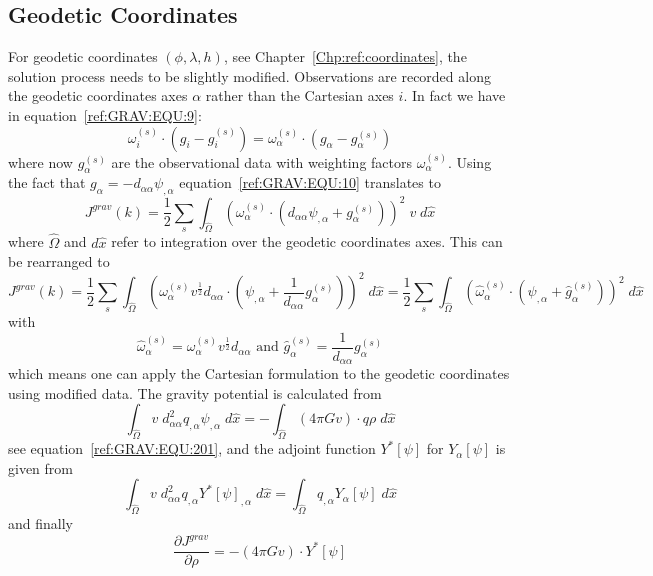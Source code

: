 \subsection{Geodetic Coordinates }
For geodetic coordinates $(\phi, \lambda, h)$, see Chapter~\ref{Chp:ref:coordinates}, the solution process needs to be slightly modified.
Observations are recorded along the geodetic coordinates axes $\alpha$ rather than the Cartesian axes $i$. In fact we
have in equation~\ref{ref:GRAV:EQU:9}:
\begin{equation}\label{ref:GRAV:EQU:300}
\omega^{(s)}_i \cdot (g_{i}- g^{(s)}_i) = \omega^{(s)}_{\alpha} \cdot (g_{{\alpha}}- g^{(s)}_{\alpha}) 
\end{equation} 
where now $g^{(s)}_{\alpha}$ are the observational data with weighting factors $\omega^{(s)}_{\alpha}$.  Using the 
fact that $g_{{\alpha}} = - d_{\alpha \alpha} \psi_{,\alpha}$ 
equation~\ref{ref:GRAV:EQU:10} translates to 
\begin{equation}\label{ref:GRAV:EQU:301}
J^{grav}(k) = \frac{1}{2}\sum_{s} \int_{\widehat{\Omega}} 
( \omega^{(s)}_{\alpha} \cdot (d_{\alpha \alpha}  \psi_{,\alpha} + g^{(s)}_{\alpha} ) ) ^2 \; v \; d\widehat{x}
\end{equation} 
where $\widehat{\Omega}$ and $d\widehat{x}$ refer to integration over the geodetic coordinates axes. This can be rearranged to 
\begin{equation}\label{ref:GRAV:EQU:301bb}
J^{grav}(k) = \frac{1}{2}\sum_{s} \int_{\widehat{\Omega}} 
(  \omega^{(s)}_{\alpha} v^{\frac{1}{2}} d_{\alpha \alpha} \cdot ( \psi_{,\alpha} + \frac{1}{d_{\alpha \alpha}} g^{(s)}_{\alpha} ) ) ^2 \; d\widehat{x}
=\frac{1}{2}\sum_{s} \int_{\widehat{\Omega}} 
(  {\widehat{\omega}}^{(s)}_{\alpha}\cdot ( \psi_{,\alpha} + \widehat{g}^{(s)}_{\alpha} ) ) ^2 \; d\widehat{x}
\end{equation} 
with 
\begin{equation}\label{ref:GRAV:EQU:301b}
 \widehat{\omega}^{(s)}_{\alpha} =\omega^{(s)}_{\alpha} v^{\frac{1}{2}} d_{\alpha \alpha} \mbox{ and }
\widehat{ g}^{(s)}_{\alpha}=
\frac{1}{d_{\alpha \alpha}} g^{(s)}_{\alpha}
\end{equation} 
which means one can apply the Cartesian formulation to the geodetic coordinates using modified data. 
The gravity potential is calculated from 
\begin{equation}\label{ref:GRAV:EQU:302}
\int_{\widehat{\Omega}} v \; d_{\alpha \alpha}^2 q_{,\alpha} \psi_{,\alpha} \;  d\widehat{x}  
= - \int_{\widehat{\Omega}}  (4\pi G v) \cdot q \rho\;  d\widehat{x} 
\end{equation} 
see equation~\ref{ref:GRAV:EQU:201}, and the adjoint function $Y^*[\psi]$ for $Y_{\alpha}[\psi]$ is given from
\begin{equation}\label{ref:GRAV:EQU:303}
\int_{\widehat{\Omega}} v  \; d_{\alpha \alpha}^2 q_{,\alpha} Y^*[\psi]_{,\alpha } \;d\widehat{x}  =
  \int_{\widehat{\Omega}} q_{,\alpha} Y_{\alpha}[\psi]  \; d\widehat{x} 
\end{equation} 
and finally 
\begin{equation}\label{ref:GRAV:EQU:310}
 \frac{\partial J^{grav}}{\partial \rho}  = - 
(4\pi G v) \cdot Y^*[\psi]
\end{equation} 
